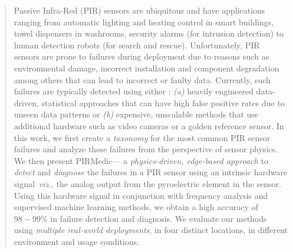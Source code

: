 \documentclass[manuscript]{acmart}
\newcommand{\viz}{{\it viz.,}\xspace}
\newcommand{\ca}{{\it (a) }}
\newcommand{\cb}{{\it (b) }}
\newcommand{\sol}{{PIRMedic}\xspace}
\begin{document}
 \begin{abstract}
	Passive Infra-Red (PIR) sensors are ubiquitous and have applications ranging from automatic lighting and heating control in smart buildings,  towel dispensers in washrooms, security alarms (for intrusion detection) to human detection robots (for search and rescue). 
	Unfortunately, PIR sensors are prone to failures during deployment due to reasons such as environmental damage, incorrect installation and component degradation among others that can lead to incorrect or faulty data. 
	Currently, such failures are typically detected using either : \ca heavily engineered data-driven, statistical approaches that can have high false positive rates due to unseen data patterns or \cb expensive, unscalable methods that use additional hardware such as video cameras or a golden reference sensor.
	In this work, we first create a \textit{taxonomy} for the most common PIR sensor failures and analyze these failures from the perspective of sensor physics.
	We then present \sol --- a \textit{physics-driven, edge-based approach} to \textit{detect} and \textit{diagnose} the failures in a PIR sensor using an intrinsic hardware signal~\viz the analog output from the pyroelectric element in the sensor. 
	Using this hardware signal in conjunction with frequency analysis and supervised machine learning methods, we obtain a high accuracy of $98-99 \%$ in failure detection and diagnosis. 
	We evaluate our methods using \textit{multiple real-world deployments}, in four distinct locations, in different environment and usage conditions.    
\end{abstract}
 
\end{document}
